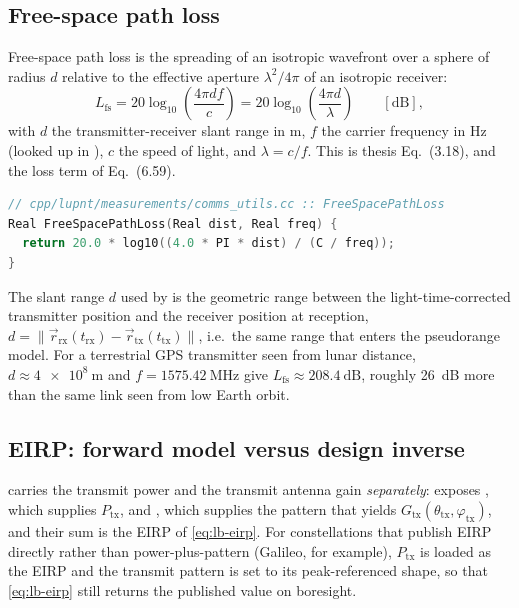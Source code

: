 \subsection{Free-space path loss}
\label{sec:lb-fspl}

Free-space path loss is the spreading of an isotropic wavefront over a sphere
of radius $d$ relative to the effective aperture $\lambda^2/4\pi$ of an
isotropic receiver:
\begin{equation}
  L_\mathrm{fs}
  =
  20\log_{10}\!\left(\frac{4\pi d f}{c}\right)
  =
  20\log_{10}\!\left(\frac{4\pi d}{\lambda}\right)
  \qquad [\si{\dB}],
  \label{eq:lb-fspl}
\end{equation}
with $d$ the transmitter-receiver slant range in \si{\meter}, $f$ the carrier
frequency in \si{\hertz} (looked up in ), $c$ the speed
of light, and $\lambda = c/f$.  This is thesis Eq.~(3.18), and the loss term of
Eq.~(6.59).

\begin{lstlisting}[language=cpp, caption={Free-space path loss.},
label={lst:lb-fspl}]
// cpp/lupnt/measurements/comms_utils.cc :: FreeSpacePathLoss
Real FreeSpacePathLoss(Real dist, Real freq) {
  return 20.0 * log10((4.0 * PI * dist) / (C / freq));
}
\end{lstlisting}

The slant range $d$ used by  is the geometric range between the
light-time-corrected transmitter position and the receiver position at
reception, $d = \lVert \vec{r}_\mathrm{rx}(t_\mathrm{rx})
- \vec{r}_\mathrm{tx}(t_\mathrm{tx})\rVert$, i.e.\ the same range that enters
the pseudorange model.  For a terrestrial GPS transmitter seen from lunar
distance, $d \approx \SI{4e8}{\meter}$ and $f = \SI{1575.42}{\mega\hertz}$ give
$L_\mathrm{fs} \approx \SI{208.4}{\dB}$, roughly \SI{26}{\dB} more than the
same link seen from low Earth orbit.

\subsection{EIRP: forward model versus design inverse}
\label{sec:lb-eirp-inverse}

\lupnt{} carries the transmit power and the transmit antenna gain
\emph{separately}:  exposes
, which supplies $P_\mathrm{tx}$, and
, which supplies the pattern that yields
$G_\mathrm{tx}(\theta_\mathrm{tx}, \varphi_\mathrm{tx})$,
and their sum is the EIRP of \cref{eq:lb-eirp}.  For constellations that
publish EIRP directly rather than power-plus-pattern (Galileo, for example),
$P_\mathrm{tx}$ is loaded as the EIRP and the transmit pattern is set to its
peak-referenced shape, so that \cref{eq:lb-eirp} still returns the published
value on boresight.

